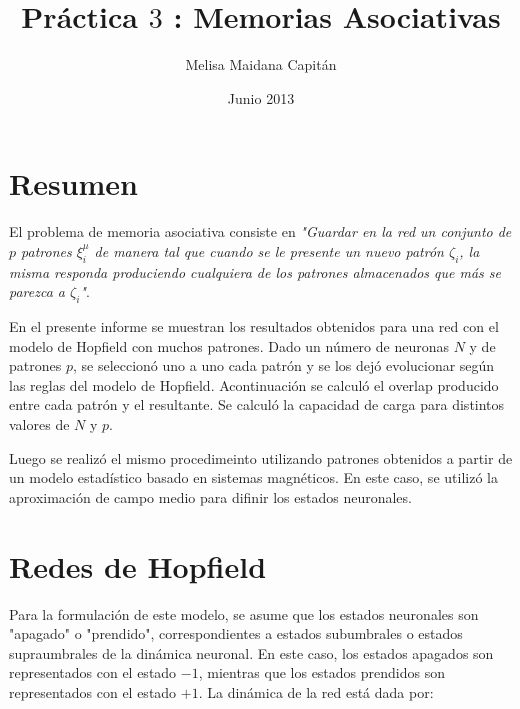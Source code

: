 \documentclass[aps,prb,onecolumn,10pt,floatfix,superscriptaddress]{article} %
\begin{document}
\title{Pr\'actica $3$ : Memorias Asociativas}

\author{Melisa Maidana Capit\'an}

\date{Junio 2013} %

\maketitle 
% 

\setlength{\parindent}{30pt}
\setlength{\parskip}{2.5ex plus 0ex minus 0ex}

\section*{Resumen}

El problema de memoria asociativa consiste en \textit{"Guardar en la red un conjunto de $p$ patrones $\xi^{\mu}_{i}$ de manera tal que cuando se le presente un nuevo patr\'on $\zeta_{i}$, la misma responda produciendo cualquiera de los patrones almacenados que m\'as se parezca a $\zeta_{i}$"}.

En el presente informe se muestran los resultados obtenidos para una red con el modelo de Hopfield con muchos patrones. Dado un n\'umero de neuronas $N$ y de patrones $p$, se seleccion\'o uno a uno cada patr\'on y se los dej\'o evolucionar seg\'un las reglas del modelo de Hopfield. Acontinuaci\'on se calcul\'o el overlap producido entre cada patr\'on y el resultante. Se calcul\'o la capacidad de carga para distintos valores de $N$ y $p$.

Luego se realiz\'o el mismo procedimeinto utilizando patrones obtenidos a partir de un modelo estad\'istico basado en sistemas magn\'eticos. En este caso, se utiliz\'o la aproximaci\'on de campo medio para difinir los estados neuronales.

\section{Redes de Hopfield}

Para la formulaci\'on de este modelo, se asume que los estados neuronales son "apagado" o "prendido", correspondientes a estados subumbrales o estados supraumbrales de la din\'amica neuronal. En este caso, los estados apagados son representados con el estado $-1$, mientras que los estados prendidos son representados con el estado $+1$. La din\'amica de la red est\'a dada por:
\end{document}
